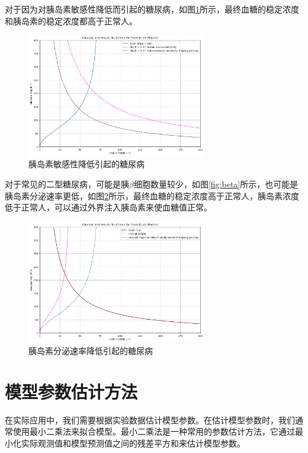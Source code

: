 对于因为对胰岛素敏感性降低而引起的糖尿病，如图\ref{fig:hyperglycemia}所示，最终血糖的稳定浓度和胰岛素的稳定浓度都高于正常人。
\begin{figure}[H]
    \centering
    \includegraphics[width=0.7\textwidth]{Img/hyperglycemia.png}
    \caption{胰岛素敏感性降低引起的糖尿病}
    \label{fig:hyperglycemia}
\end{figure}

对于常见的二型糖尿病，可能是胰$\beta$细胞数量较少，如图\ref{fig:beta}所示，也可能是胰岛素分泌速率更低，如图\ref{fig:lessinsulin}所示，最终血糖的稳定浓度高于正常人，胰岛素浓度低于正常人，可以通过外界注入胰岛素来使血糖值正常。
\begin{figure}[H]
    \centering
    \includegraphics[width=0.7\textwidth]{Img/lessinsulin.png}
    \caption{胰岛素分泌速率降低引起的糖尿病}
    \label{fig:lessinsulin}
\end{figure}
\section{模型参数估计方法}
在实际应用中，我们需要根据实验数据估计模型参数。在估计模型参数时，我们通常使用最小二乘法来拟合模型。最小二乘法是一种常用的参数估计方法，它通过最小化实际观测值和模型预测值之间的残差平方和来估计模型参数。

